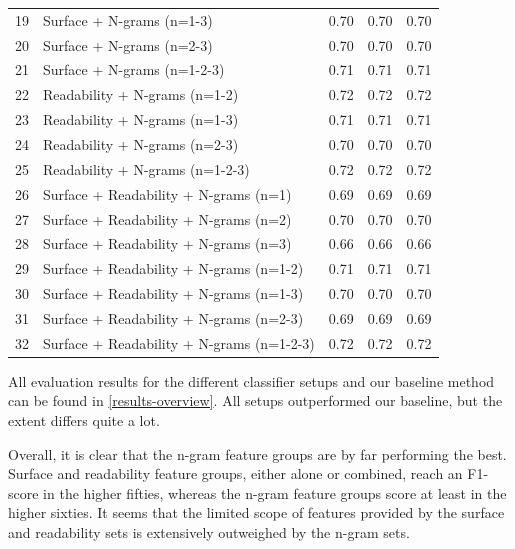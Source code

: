 \documentclass[
10pt, %
a4paper, %
oneside, %
headinclude,footinclude, %
] {book}%
\begin{document}
\begin{table}[]
\begin{tabular}{@{}lllll@{}}
19 & Surface + N-grams (n=1-3)                 & 0.70          & 0.70       & 0.70 \\
20 & Surface + N-grams (n=2-3)                 & 0.70          & 0.70       & 0.70 \\
21 & Surface + N-grams (n=1-2-3)               & 0.71          & 0.71       & 0.71 \\
22 & Readability + N-grams (n=1-2)             & 0.72          & 0.72       & 0.72 \\
23 & Readability + N-grams (n=1-3)             & 0.71          & 0.71       & 0.71 \\
24 & Readability + N-grams (n=2-3)             & 0.70          & 0.70       & 0.70 \\
25 & Readability + N-grams (n=1-2-3)           & 0.72          & 0.72       & 0.72 \\
26 & Surface + Readability + N-grams (n=1)     & 0.69          & 0.69       & 0.69 \\
27 & Surface + Readability + N-grams (n=2)     & 0.70          & 0.70       & 0.70 \\
28 & Surface + Readability + N-grams (n=3)     & 0.66          & 0.66       & 0.66 \\
29 & Surface + Readability + N-grams (n=1-2)   & 0.71          & 0.71       & 0.71 \\
30 & Surface + Readability + N-grams (n=1-3)   & 0.70          & 0.70       & 0.70 \\
31 & Surface + Readability + N-grams (n=2-3)   & 0.69          & 0.69       & 0.69 \\
32 & Surface + Readability + N-grams (n=1-2-3) & 0.72          & 0.72       & 0.72 \\ \bottomrule
\end{tabular}
\end{table}

All evaluation results for the different classifier setups and our baseline method can be found in \autoref{results-overview}. All setups outperformed our baseline, but the extent differs quite a lot. 

Overall, it is clear that the n-gram feature groups are by far performing the best. Surface and readability feature groups, either alone or combined, reach an F1-score in the higher fifties, whereas the n-gram feature groups score at least in the higher sixties. It seems that the limited scope of features provided by the surface and readability sets is extensively outweighed by the n-gram sets. 
\end{document}
